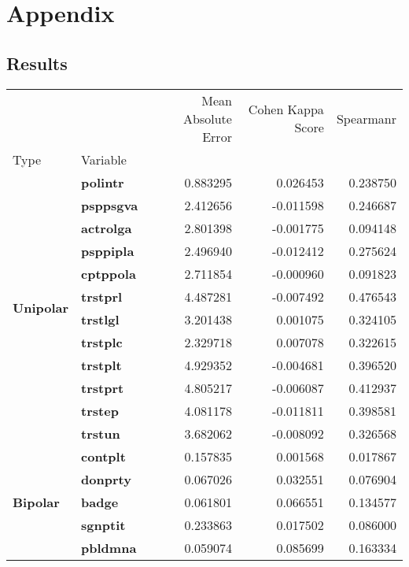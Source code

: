 \newpage
\section*{Appendix}
\subsection*{Results}

\begin{table}[H]
    \begin{tabular}{llrrr}
    \toprule
     &  & Mean Absolute Error & Cohen Kappa Score & Spearmanr \\
    Type & Variable &  &  &  \\
    \midrule
    \multirow[t]{12}{*}{\textbf{Unipolar}} & \textbf{polintr} & 0.883295 & 0.026453 & 0.238750 \\
    \textbf{} & \textbf{psppsgva} & 2.412656 & -0.011598 & 0.246687 \\
    \textbf{} & \textbf{actrolga} & 2.801398 & -0.001775 & 0.094148 \\
    \textbf{} & \textbf{psppipla} & 2.496940 & -0.012412 & 0.275624 \\
    \textbf{} & \textbf{cptppola} & 2.711854 & -0.000960 & 0.091823 \\
    \textbf{} & \textbf{trstprl} & 4.487281 & -0.007492 & 0.476543 \\
    \textbf{} & \textbf{trstlgl} & 3.201438 & 0.001075 & 0.324105 \\
    \textbf{} & \textbf{trstplc} & 2.329718 & 0.007078 & 0.322615 \\
    \textbf{} & \textbf{trstplt} & 4.929352 & -0.004681 & 0.396520 \\
    \textbf{} & \textbf{trstprt} & 4.805217 & -0.006087 & 0.412937 \\
    \textbf{} & \textbf{trstep} & 4.081178 & -0.011811 & 0.398581 \\
    \textbf{} & \textbf{trstun} & 3.682062 & -0.008092 & 0.326568 \\
    \cline{1-5}
    \multirow[t]{29}{*}{\textbf{Bipolar}} & \textbf{contplt} & 0.157835 & 0.001568 & 0.017867 \\
    \textbf{} & \textbf{donprty} & 0.067026 & 0.032551 & 0.076904 \\
    \textbf{} & \textbf{badge} & 0.061801 & 0.066551 & 0.134577 \\
    \textbf{} & \textbf{sgnptit} & 0.233863 & 0.017502 & 0.086000 \\
    \textbf{} & \textbf{pbldmna} & 0.059074 & 0.085699 & 0.163334 \\

\end{tabular}
\end{table}
